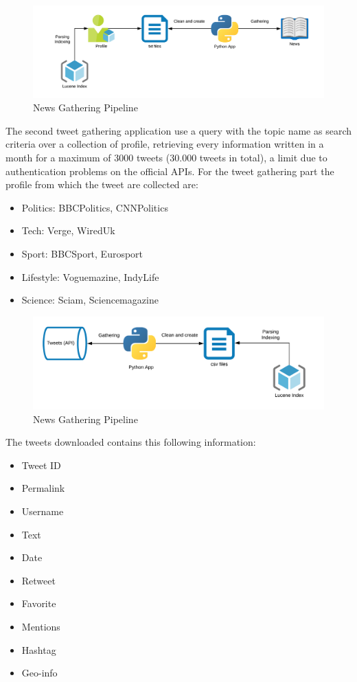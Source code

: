 \documentclass[11pt, english]{article}
\begin{document}
\begin{figure}[H]
  \includegraphics[width=16cm]{Resources/News.png}
  \caption{News Gathering Pipeline} 
\end{figure}


The second tweet gathering application use a query with the topic name as search criteria over a collection of profile, retrieving every information written in a month for a maximum of 3000 tweets (30.000 tweets in total), a limit due to authentication problems on the official APIs.
For the tweet gathering part the profile from which the tweet are collected are:
\begin{itemize}
\item Politics: BBCPolitics, CNNPolitics
\item Tech: Verge, WiredUk
\item Sport: BBCSport, Eurosport
\item Lifestyle: Voguemazine, IndyLife
\item Science: Sciam, Sciencemagazine
\end{itemize}

\begin{figure}[H]
  \includegraphics[width=16cm]{Resources/Tweets.png}
  \caption{News Gathering Pipeline} 
\end{figure}

The tweets downloaded contains this following information:
\begin{multicols}{3}
\begin{itemize}
\item Tweet ID
\item Permalink
\item Username
\item Text
\item Date
\item Retweet
\item Favorite
\item Mentions
\item Hashtag
\item Geo-info
\end{itemize}
\end{multicols}
\end{document}
